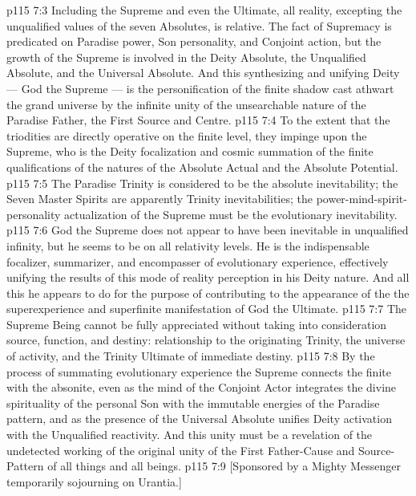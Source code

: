\vs p115 7:3 \pc Including the Supreme and even the Ultimate, all reality, excepting the unqualified values of the seven Absolutes, is relative. The fact of Supremacy is predicated on Paradise power, Son personality, and Conjoint action, but the growth of the Supreme is involved in the Deity Absolute, the Unqualified Absolute, and the Universal Absolute. And this synthesizing and unifying Deity --- God the Supreme --- is the personification of the finite shadow cast athwart the grand universe by the infinite unity of the unsearchable nature of the Paradise Father, the First Source and Centre.
\vs p115 7:4 To the extent that the triodities are directly operative on the finite level, they impinge upon the Supreme, who is the Deity focalization and cosmic summation of the finite qualifications of the natures of the Absolute Actual and the Absolute Potential.
\vs p115 7:5 \pc The Paradise Trinity is considered to be the absolute inevitability; the Seven Master Spirits are apparently Trinity inevitabilities; the power\hyp{}mind\hyp{}spirit\hyp{}personality actualization of the Supreme must be the evolutionary inevitability.
\vs p115 7:6 God the Supreme does not appear to have been inevitable in unqualified infinity, but he seems to be on all relativity levels. He is the indispensable focalizer, summarizer, and encompasser of evolutionary experience, effectively unifying the results of this mode of reality perception in his Deity nature. And all this he appears to do for the purpose of contributing to the appearance of the  the superexperience and superfinite manifestation of God the Ultimate.
\vs p115 7:7 The Supreme Being cannot be fully appreciated without taking into consideration source, function, and destiny: relationship to the originating Trinity, the universe of activity, and the Trinity Ultimate of immediate destiny.
\vs p115 7:8 By the process of summating evolutionary experience the Supreme connects the finite with the absonite, even as the mind of the Conjoint Actor integrates the divine spirituality of the personal Son with the immutable energies of the Paradise pattern, and as the presence of the Universal Absolute unifies Deity activation with the Unqualified reactivity. And this unity must be a revelation of the undetected working of the original unity of the First Father\hyp{}Cause and Source\hyp{}Pattern of all things and all beings.
\vsetoff
\vs p115 7:9 [Sponsored by a Mighty Messenger temporarily sojourning on Urantia.]
